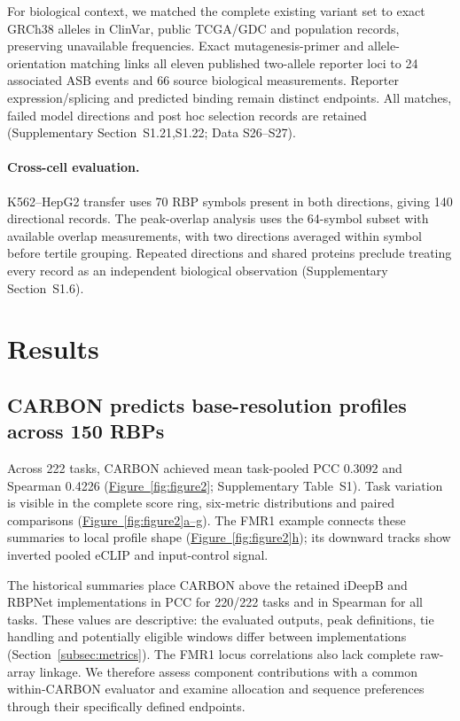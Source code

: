 \documentclass[webpdf,contemporary,large]{oup-authoring-template}
\newcommand{\figrefwhole}[1]{\hyperref[#1]{Figure~\ref*{#1}}}
\newcommand{\figpanelref}[2]{\hyperref[#1]{Figure~\ref*{#1}#2}}
\newcommand{\suptab}[1]{Supplementary Table~#1}
\newcommand{\supsect}[1]{Supplementary Section~#1}
\begin{document}
For biological context, we matched the complete existing variant set to exact GRCh38 alleles in ClinVar, public TCGA/GDC and population records, preserving unavailable frequencies. Exact mutagenesis-primer and allele-orientation matching links all eleven published two-allele reporter loci to 24 associated ASB events and 66 source biological measurements. Reporter expression/splicing and predicted binding remain distinct endpoints. All matches, failed model directions and post hoc selection records are retained (\supsect{S1.21,S1.22}; Data S26--S27).

\paragraph{Cross-cell evaluation.}
K562--HepG2 transfer uses 70 RBP symbols present in both directions, giving 140 directional records. The peak-overlap analysis uses the 64-symbol subset with available overlap measurements, with two directions averaged within symbol before tertile grouping. Repeated directions and shared proteins preclude treating every record as an independent biological observation (\supsect{S1.6}).

\section{Results}\label{sec:results}

\subsection{CARBON predicts base-resolution profiles across 150 RBPs}\label{subsec:benchmark}

Across 222 tasks, CARBON achieved mean task-pooled PCC 0.3092 and Spearman 0.4226 (\figrefwhole{fig:figure2}; \suptab{S1}). Task variation is visible in the complete score ring, six-metric distributions and paired comparisons (\figpanelref{fig:figure2}{a--g}). The FMR1 example connects these summaries to local profile shape (\figpanelref{fig:figure2}{h}); its downward tracks show inverted pooled eCLIP and input-control signal.

The historical summaries place CARBON above the retained iDeepB and RBPNet implementations in PCC for 220/222 tasks and in Spearman for all tasks. These values are descriptive: the evaluated outputs, peak definitions, tie handling and potentially eligible windows differ between implementations (Section~\ref{subsec:metrics}). The FMR1 locus correlations also lack complete raw-array linkage. We therefore assess component contributions with a common within-CARBON evaluator and examine allocation and sequence preferences through their specifically defined endpoints.
\end{document}
